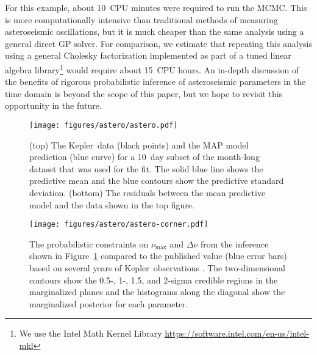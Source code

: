 \documentclass[manuscript, letterpaper]{aastex6}
\newcommand{\project}[1]{\textsf{#1}}
\newcommand{\kepler}{\project{Kepler}}
\newcommand{\figureref}[1]{\ref{fig:#1}}
\newcommand{\Figure}[1]{Figure~\figureref{#1}}
\newcommand{\figurelabel}[1]{\label{fig:#1}}
\newcommand{\response}[1]{{#1}}
\newcommand{\responseb}[1]{{#1}}
\begin{document}
{    \responseb{For this example, about 10~CPU minutes were required to run the
        MCMC.}
    This is more computationally intensive than traditional methods of measuring
    asteroseismic oscillations, but it is much cheaper than the same analysis
    using a general direct GP solver.
    For comparison, we estimate that repeating this analysis using a general
    Cholesky factorization implemented as part of a tuned linear algebra
    library\footnote{We use the Intel Math Kernel Library
        \url{https://software.intel.com/en-us/intel-mkl}} would require about 15~CPU
    hours.
    An in-depth discussion of the benefits of rigorous probabilistic inference of
    asteroseismic parameters in the time domain is beyond the scope of this paper,
    but we hope to revisit this opportunity in the future.
}



\begin{figure}[!hptb]
    \begin{center}
        \texttt{[image: figures/astero/astero.pdf]}
        \caption{
            \response{
                (top) The \kepler\ data (black points) and the MAP model
                prediction (blue curve) for a 10~day subset of the month-long dataset that
                was used for the fit.
                The solid blue line shows the predictive mean and the blue contours show
                the predictive standard deviation.
                (bottom) The residuals between the mean predictive model and the data
                shown in the top figure.
            }
            \figurelabel{astero}}
    \end{center}
\end{figure}

\begin{figure}[!p]
    \begin{center}
        \texttt{[image: figures/astero/astero-corner.pdf]}
        \caption{The probabilistic constraints on $\nu_\mathrm{max}$ and $\Delta \nu$
            from the inference shown in \Figure{astero} compared to the published
            value (\responseb{blue error bars}) based on several years of \kepler\
            observations \citep{Pinsonneault:2014}.
            The two-dimensional contours show the 0.5-, 1-, 1.5, and 2-sigma credible
            regions in the marginalized planes and the histograms along the diagonal
            show the marginalized posterior for each parameter.
            \figurelabel{astero-corner}}
    \end{center}
\end{figure}
\end{document}
